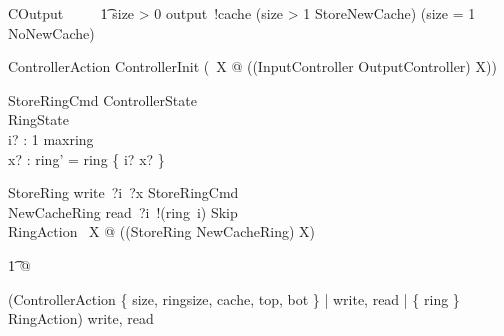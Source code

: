 \begin{circusaction}
    COutput ~~\circdef~~
            \t1 \lcircguard size > 0 \rcircguard \circguard output~!cache \then
            (\lcircguard size > 1 \rcircguard \circguard StoreNewCache)
            \extchoice
            (\lcircguard size = 1 \rcircguard \circguard NoNewCache)
\end{circusaction}



    
\begin{circusaction}
    ControllerAction \circdef ControllerInit \circseq (\circmu\ X @ ((InputController \extchoice OutputController) \circseq X)) \\
\end{circusaction}


\begin{schema}{StoreRingCmd}
    \Xi ControllerState
    \\%
    \Delta RingState
    \\%
    i? : 1 \upto maxring
    \\%
    x? : \nat
\where
    ring' = ring \oplus \{ i? \mapsto x? \} 
\end{schema}

\begin{circusaction}
   StoreRing \circdef write~?i~?x \then StoreRingCmd \\
   NewCacheRing \circdef read~?i~!(ring~i) \then Skip \\
   RingAction \circdef \circmu\ X @ ((StoreRing \extchoice NewCacheRing) \circseq X) 
\end{circusaction}

\begin{circusaction}
    \t1 @

   (ControllerAction \lpar
        \{ size, ringsize, cache, top, bot \} |
        \lchanset write, read \rchanset |
        \{ ring \} \rpar
    RingAction) \circhide \lchanset write, read \rchanset
\end{circusaction}

\begin{circus}
    \circend
\end{circus}
